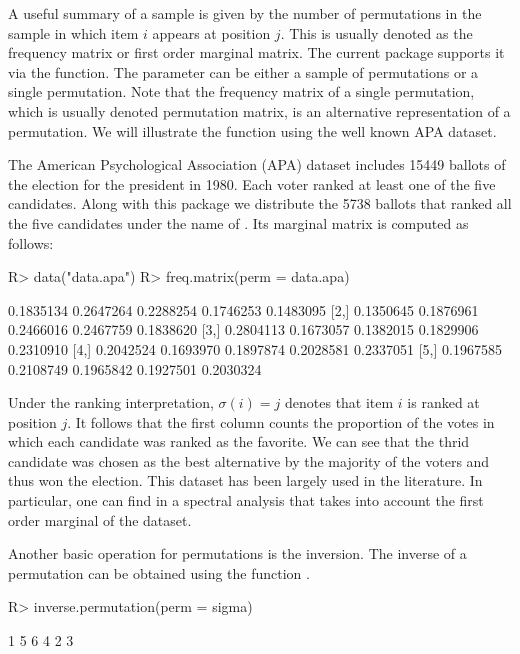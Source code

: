 \documentclass[article,nojss]{jss}
\begin{document}
A useful summary of a sample is given by the number of permutations in the sample in which item $i$ appears at position $j$. This is usually denoted as the frequency matrix or first order marginal matrix. The current package supports it via the  function. The parameter  can be either a sample of permutations or a single permutation. Note that the frequency matrix of a single permutation, which is usually denoted permutation matrix, is an alternative representation of a permutation. We will illustrate the  function using the well known APA dataset. 
 
The American Psychological Association (APA) dataset includes 15449 ballots of the election for the president in 1980. Each voter ranked at least one of the five candidates. Along with this package we distribute the 5738 ballots that ranked all the five candidates under the name of . Its marginal matrix is computed as follows: 
\begin{Schunk}
\begin{Sinput}
R> data("data.apa")
R> freq.matrix(perm = data.apa)
\end{Sinput}
\begin{Soutput}
          [,1]      [,2]      [,3]      [,4]      [,5]
[1,] 0.1835134 0.2647264 0.2288254 0.1746253 0.1483095
[2,] 0.1350645 0.1876961 0.2466016 0.2467759 0.1838620
[3,] 0.2804113 0.1673057 0.1382015 0.1829906 0.2310910
[4,] 0.2042524 0.1693970 0.1897874 0.2028581 0.2337051
[5,] 0.1967585 0.2108749 0.1965842 0.1927501 0.2030324
\end{Soutput}
\end{Schunk}

Under the ranking interpretation, $\sigma(i)=j$ denotes that item $i$ is ranked at position $j$. It follows that the first column counts the proportion of the votes in which each candidate was ranked as the favorite. We can see that the thrid candidate was chosen as the best alternative by the majority of the voters and thus won the election. This dataset has been largely used in the literature. In particular, one can find in \cite{diaconis1989} a spectral analysis that takes into account the first order marginal of the dataset.

Another basic operation for permutations is the inversion. The inverse of a permutation can be obtained using the function .
\begin{Schunk}
\begin{Sinput}
R> inverse.permutation(perm = sigma)
\end{Sinput}
\begin{Soutput}
[1] 1 5 6 4 2 3
\end{Soutput}
\end{Schunk}
\end{document}
